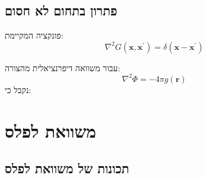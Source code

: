 \documentclass{tstextbook}
\begin{document}
\subsection{פתרון בתחום לא חסום}

\begin{definition}
פונקציה המקיימת:
$$\nabla^{2}G(\mathbf{x},\mathbf{x}^{\prime})=\delta(\mathbf{x}-\mathbf{x}^{\prime})$$

\end{definition}
\begin{proposition}
עבור משוואה דיפרנציאלית מהצורה:
$$\nabla^{2}\Phi=-4\pi g(\mathbf{r})$$
נקבל כי:

\end{proposition}
\section{משוואת לפלס}

\subsection{תכונות של משוואת לפלס}
\end{document}
